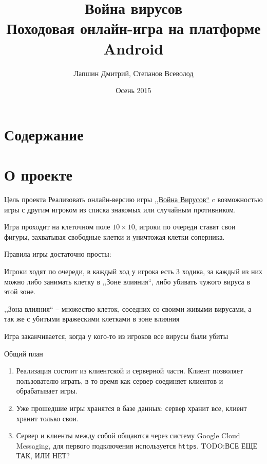 \documentclass{beamer}
\title[Война вирусов]{Война вирусов\\Походовая онлайн-игра на платформе Android}
\author{Лапшин Дмитрий, Степанов Всеволод}
\institute{СПб АУ РАН}
\date{Осень 2015}
\makeatletter
\newcommand*{\currentname}{\@currentlabelname}
\def\t{\texttt}
\newcommand{\cimg}[2]{%
    \begin{center}%
        \ifthenelse{\equal{#2}{}}{%
            \texttt{[image: \#1]}
        }{%
            \texttt{[image: \#1]}
        }%
    \end{center}%
}
\makeatother
\begin{document}
\begin{frame}
    \titlepage
\end{frame}

\section{Содержание}

\begin{frame}[t]{\currentname}
    \tableofcontents
\end{frame}

\section{О проекте}

\begin{frame}[t]{Цель проекта}
    Реализовать онлайн-версию игры
    \href{https://ru.wikipedia.org/wiki/\%D0\%92\%D0\%BE\%D0\%B9\%D0\%BD\%D0\%B0\_\%D0\%B2\%D0\%B8\%D1\%80\%D1\%83\%D1\%81\%D0\%BE\%D0\%B2}{,,Война Вирусов``}
    c возможностью игры с другим игроком из списка знакомых или случайным противником.

    Игра проходит на клеточном поле $10 \times 10$, игроки по очереди ставят свои фигуры, захватывая свободные клетки и уничтожая клетки соперника.
    
    \pause
    Правила игры достаточно просты: 
    
    Игроки ходят по очереди, в каждый ход у игрока есть 3 ходика, за каждый из них можно либо занимать клетку в ,,Зоне влияния``, либо убивать чужого вируса в этой зоне.
    
    ,,Зона влияния`` -- множество клеток, соседних со своими живыми вирусами, а так же с убитыми вражескими клетками в зоне влияния
    
\end{frame}

\begin{frame}[t]{\currentname}
    Игра заканчивается, когда у кого-то из игроков все вирусы были убиты

    \cimg{01.png}{0.4}
\end{frame}

\begin{frame}[t]{Общий план}
    \begin{enumerate}
    \item
        Реализация состоит из клиентской и серверной части.
        Клиент позволяет пользователю играть, в то время как сервер соединяет клиентов и обрабатывает игры.
    \pause

    \item
        Уже прошедшие игры хранятся в базе данных: сервер хранит все, клиент хранит только свои.
    \pause
    
    \item
        Сервер и клиенты между собой общаются через систему Google Cloud Messaging, для первого подключения используется \t{https}. TODO:ВСЕ ЕЩЕ ТАК, ИЛИ НЕТ?
    \end{enumerate}
\end{frame}
\end{document}

